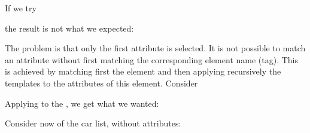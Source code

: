 %
\begin{slide}
 
\raggedslides[0pt]

If we try 

\end{slide}

%
\begin{slide}
 
\raggedslides[0pt]

the result is not what we expected:
{\small}


\end{slide}


%
\begin{slide}
 
\raggedslides[0pt]

The problem is that only the first attribute is selected. It is not
possible to match an attribute without first matching the
corresponding element name (tag). This is achieved by matching first
the element and then applying recursively the templates to the
attributes of this element. Consider 

\end{slide}


%
\begin{slide}
 
\raggedslides[0pt]

Applying  to the
, we get what we wanted:
{\small}

\end{slide}


%
\begin{slide}
\label{cars2}
\hypertarget{hyper:cars2}{}

\raggedslides[0pt]

Consider now  of the car list,
without attributes:

\end{slide}


